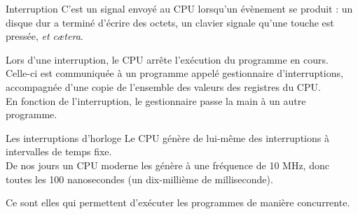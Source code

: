 \documentclass[10pt]{nsibeamer}
\begin{document}
\begin{frame}{Interruption}\pause
C'est un signal envoyé au CPU lorsqu'un évènement se produit : un disque dur a terminé d'écrire des octets, un clavier signale qu'une touche est pressée, \textit{et c\ae tera}.\\\pause

Lors d'une interruption, le CPU arrête l'exécution du programme en cours.\\
Celle-ci est communiquée à un programme appelé \alert{gestionnaire d'interruptions}, accompagnée d'une copie de l'ensemble des valeurs des registres du CPU.\\\pause
En fonction de l'interruption, le gestionnaire passe la main à un autre programme.
\end{frame}
\begin{frame}{Les interruptions d'horloge}\pause
Le CPU génère de lui-même des interruptions à intervalles de temps fixe.\\\pause
De nos jours un CPU moderne les génère à une fréquence de 10 MHz, donc toutes les 100 nanosecondes (un dix-millième de milliseconde).\\\pause

Ce sont elles qui permettent d'exécuter les programmes de manière concurrente.
\end{frame}
\end{document}
